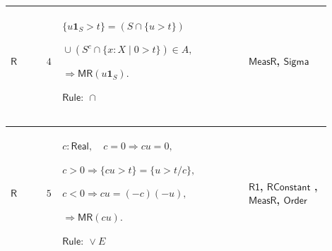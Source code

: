 \documentclass[12pt,reqno]{amsart}
\theoremstyle{blueplain}
\numberwithin{equation}{section}
\begin{document}
{\scriptsize \setlength{\parskip}{0pt}\nointerlineskip
\noindent 
\begin{tabular}{|@{}>{\centering\arraybackslash}m{0.10658\linewidth}|>{\centering\arraybackslash}m{0.03553\linewidth}|>{\centering\arraybackslash}m{0.52105\linewidth}|>{\centering\arraybackslash}m{0.23684\linewidth}|}
\hline
\hypertarget{dct:R4}{$\displaystyle \mathsf{R}$} & $\displaystyle 4$ & $%
\displaystyle \{u\mathbf{1}_S>t\}=(S\cap\{u>t\})$\par$\displaystyle %
{}\cup(S^c\cap\{x:X\mid0>t\})\in A,$\par$\displaystyle \Rightarrow\mathsf{MR}%
(u\mathbf{1}_S).$\par$\displaystyle \mathsf{Rule}:\ \cap$ & \hyperlink{dctdef:MeasR}%
{$\displaystyle \mathsf{MeasR}$}, \hyperlink{ax:Sigma}{$\displaystyle 
\mathsf{Sigma}$} \\ \hline
\end{tabular}%
}

{\scriptsize \setlength{\parskip}{0pt}\nointerlineskip
\noindent 
\begin{tabular}{|@{}>{\centering\arraybackslash}m{0.10658\linewidth}|>{\centering\arraybackslash}m{0.03553\linewidth}|>{\centering\arraybackslash}m{0.52105\linewidth}|>{\centering\arraybackslash}m{0.23684\linewidth}|}
\hline
\hypertarget{dct:R5}{$\displaystyle \mathsf{R}$} & $\displaystyle 5$ & $%
\displaystyle c:\mathsf{Real},\quad c=0\Rightarrow cu=0,$\par$\displaystyle %
c>0\Rightarrow\{cu>t\}=\{u>t/c\},$\par$\displaystyle c<0\Rightarrow
cu=(-c)(-u),$\par$\displaystyle \Rightarrow\mathsf{MR}(cu).$\par$%
\displaystyle \mathsf{Rule}:\ \lor E$ & \hyperlink{dct:R1}{$\displaystyle 
\mathsf{R1}$}, \hyperlink{dct:RConstant}{$\displaystyle \mathsf{RConstant}$}%
, \hyperlink{dctdef:MeasR}{$\displaystyle \mathsf{MeasR}$}, \hyperlink{ax:Order}%
{$\displaystyle \mathsf{Order}$} \\ \hline
\end{tabular}%
}
\end{document}
